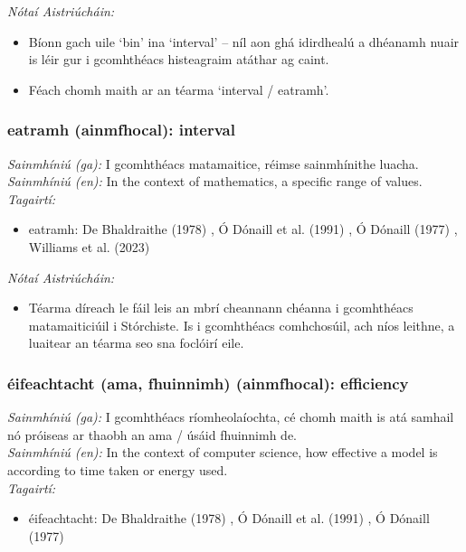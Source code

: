 \documentclass{article}
\begin{document}
 \noindent \textit{Nótaí Aistriúcháin:}
\begin{itemize}
	\item Bíonn gach uile `bin' ina `interval' -- níl aon ghá idirdhealú a dhéanamh nuair is léir gur i gcomhthéacs histeagraim atáthar ag caint.
	\item Féach chomh maith ar an téarma `interval / eatramh'.
\end{itemize}


\subsubsection*{eatramh (ainmfhocal): interval}
 \noindent \textit{Sainmhíniú (ga):} I gcomhthéacs matamaitice, réimse sainmhínithe luacha.
\\
 \noindent \textit{Sainmhíniú (en):} In the context of mathematics, a specific range of values.
\\
 \noindent \textit{Tagairtí:}
\begin{itemize}
	\item eatramh: De Bhaldraithe (1978) \cite{de-bhaldraithe}, Ó Dónaill et al. (1991) \cite{focloir-beag}, Ó Dónaill (1977) \cite{odonaill}, Williams et al. (2023) \cite{storchiste}
\end{itemize}

 \noindent \textit{Nótaí Aistriúcháin:}
\begin{itemize}
	\item Téarma díreach le fáil leis an mbrí cheannann chéanna i gcomhthéacs matamaiticiúil i Stórchiste. Is i gcomhthéacs comhchosúil, ach níos leithne, a luaitear an téarma seo sna foclóirí eile.
\end{itemize}


\subsubsection*{éifeachtacht (ama, fhuinnimh) (ainmfhocal): efficiency}
 \noindent \textit{Sainmhíniú (ga):} I gcomhthéacs ríomheolaíochta, cé chomh maith is atá samhail nó próiseas ar thaobh an ama / úsáid fhuinnimh de.
\\
 \noindent \textit{Sainmhíniú (en):} In the context of computer science, how effective a model is according to time taken or energy used.
\\
 \noindent \textit{Tagairtí:}
\begin{itemize}
	\item éifeachtacht: De Bhaldraithe (1978) \cite{de-bhaldraithe}, Ó Dónaill et al. (1991) \cite{focloir-beag}, Ó Dónaill (1977) \cite{odonaill}
\end{itemize}
\end{document}

